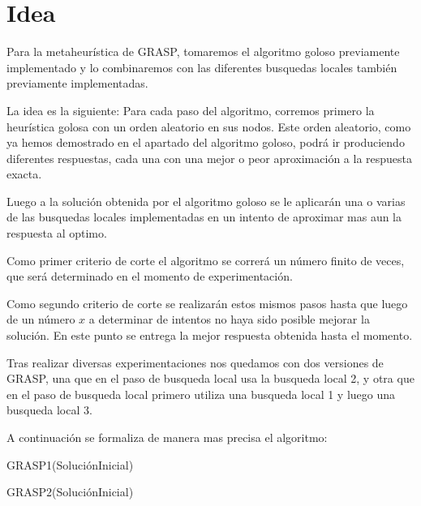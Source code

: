 \section{Idea}

Para la metaheurística de GRASP, tomaremos el algoritmo goloso previamente implementado y lo combinaremos con las diferentes busquedas locales también previamente implementadas.

La idea es la siguiente: Para cada paso del algoritmo, corremos primero la heurística golosa con un orden aleatorio en sus nodos. Este orden aleatorio, como ya hemos demostrado en el apartado del algoritmo goloso, podrá ir produciendo diferentes respuestas, cada una con una mejor o peor aproximación a la respuesta exacta.

Luego a la solución obtenida por el algoritmo goloso se le aplicarán una o varias de las busquedas locales implementadas en un intento de aproximar mas aun la respuesta al optimo.

Como primer criterio de corte el algoritmo se correrá un número finito de veces, que será determinado en el momento de experimentación.

Como segundo criterio de corte se realizarán estos mismos pasos hasta que luego de un número $x$ a determinar de intentos no haya sido posible mejorar la solución. En este punto se entrega la mejor respuesta obtenida hasta el momento.

Tras realizar diversas experimentaciones nos quedamos con dos versiones de GRASP, una que en el paso de busqueda local usa la busqueda local 2, y otra que en el paso de busqueda local primero utiliza una busqueda local 1 y luego una busqueda local 3.

A continuación se formaliza de manera mas precisa el algoritmo:

\begin{algorithm}
  	\begin{algorithmic}[1]\parskip=1mm
		 \caption{ GRASP1(SoluciónInicial) }
	\end{algorithmic}
\end{algorithm}

\begin{algorithm}
  	\begin{algorithmic}[1]\parskip=1mm
		 \caption{ GRASP2(SoluciónInicial) }
	\end{algorithmic}
\end{algorithm}

